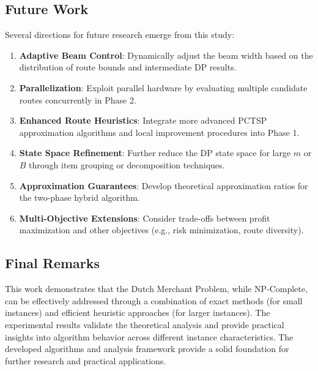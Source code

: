 \documentclass[12pt]{article}
\begin{document}
\subsection{Future Work}

Several directions for future research emerge from this study:

\begin{enumerate}
    \item \textbf{Adaptive Beam Control}: Dynamically adjust the beam width based on the distribution of route bounds and intermediate DP results.
    
    \item \textbf{Parallelization}: Exploit parallel hardware by evaluating multiple candidate routes concurrently in Phase 2.
    
    \item \textbf{Enhanced Route Heuristics}: Integrate more advanced PCTSP approximation algorithms and local improvement procedures into Phase 1.
    
    \item \textbf{State Space Refinement}: Further reduce the DP state space for large $m$ or $B$ through item grouping or decomposition techniques.
    
    \item \textbf{Approximation Guarantees}: Develop theoretical approximation ratios for the two-phase hybrid algorithm.
    
    \item \textbf{Multi-Objective Extensions}: Consider trade-offs between profit maximization and other objectives (e.g., risk minimization, route diversity).
\end{enumerate}

\subsection{Final Remarks}

This work demonstrates that the Dutch Merchant Problem, while NP-Complete, can be effectively addressed through a combination of exact methods (for small instances) and efficient heuristic approaches (for larger instances). The experimental results validate the theoretical analysis and provide practical insights into algorithm behavior across different instance characteristics. The developed algorithms and analysis framework provide a solid foundation for further research and practical applications.



\end{document}
